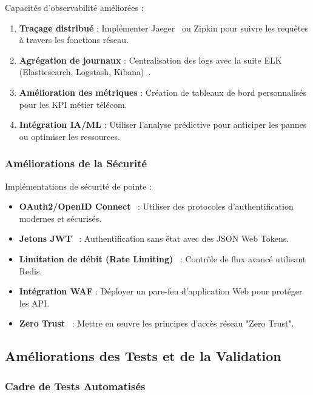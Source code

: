 \documentclass[12pt,a4paper]{report}
\begin{document}
Capacités d'observabilité améliorées :

\begin{enumerate}
    \item \textbf{Traçage distribué} : Implémenter Jaeger~\cite{jaeger-docs} ou Zipkin pour suivre les requêtes à travers les fonctions réseau.
    \item \textbf{Agrégation de journaux} : Centralisation des logs avec la suite ELK (Elasticsearch, Logstash, Kibana)~\cite{elk-stack}.
    \item \textbf{Amélioration des métriques} : Création de tableaux de bord personnalisés pour les KPI métier télécom.
    \item \textbf{Intégration IA/ML} : Utiliser l'analyse prédictive pour anticiper les pannes ou optimiser les ressources.
\end{enumerate}

\subsubsection{Améliorations de la Sécurité}

Implémentations de sécurité de pointe :

\begin{itemize}
    \item \textbf{OAuth2/OpenID Connect}~\cite{oauth2-spec} : Utiliser des protocoles d'authentification modernes et sécurisés.
    \item \textbf{Jetons JWT}~\cite{jwt-spec} : Authentification sans état avec des JSON Web Tokens.
    \item \textbf{Limitation de débit (Rate Limiting)}~\cite{redis-docs} : Contrôle de flux avancé utilisant Redis.
    \item \textbf{Intégration WAF} : Déployer un pare-feu d'application Web pour protéger les API.
    \item \textbf{Zero Trust}~\cite{zero-trust} : Mettre en œuvre les principes d'accès réseau "Zero Trust".
\end{itemize}

\subsection{Améliorations des Tests et de la Validation}

\subsubsection{Cadre de Tests Automatisés}
\end{document}

